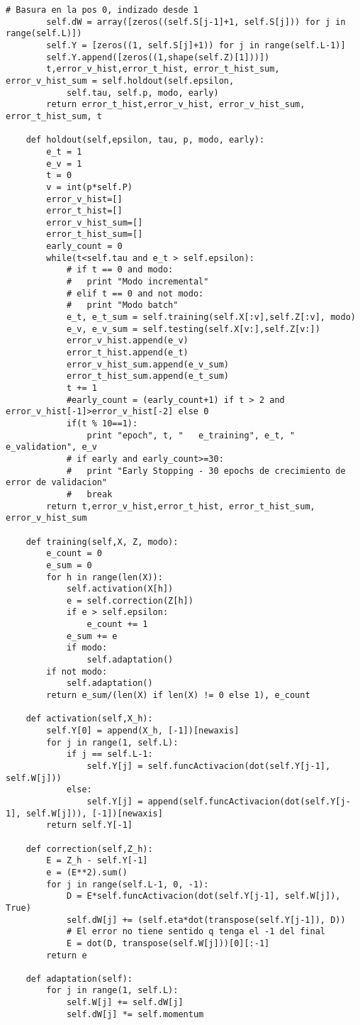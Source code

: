 \begin{lstlisting}[caption=new\_perceptron.py]
		# Basura en la pos 0, indizado desde 1
		self.dW = array([zeros((self.S[j-1]+1, self.S[j])) for j in range(self.L)])
		self.Y = [zeros((1, self.S[j]+1)) for j in range(self.L-1)]
		self.Y.append([zeros((1,shape(self.Z)[1]))])
		t,error_v_hist,error_t_hist, error_t_hist_sum, error_v_hist_sum = self.holdout(self.epsilon, 
			self.tau, self.p, modo, early)
		return error_t_hist,error_v_hist, error_v_hist_sum, error_t_hist_sum, t

	def holdout(self,epsilon, tau, p, modo, early):
		e_t = 1
		e_v = 1
		t = 0
		v = int(p*self.P)
		error_v_hist=[]
		error_t_hist=[]
		error_v_hist_sum=[]
		error_t_hist_sum=[]
		early_count = 0
		while(t<self.tau and e_t > self.epsilon):
			# if t == 0 and modo:
			# 	print "Modo incremental"
			# elif t == 0 and not modo:
			# 	print "Modo batch"			
			e_t, e_t_sum = self.training(self.X[:v],self.Z[:v], modo)
			e_v, e_v_sum = self.testing(self.X[v:],self.Z[v:])
			error_v_hist.append(e_v)
			error_t_hist.append(e_t)
			error_v_hist_sum.append(e_v_sum)
			error_t_hist_sum.append(e_t_sum)
			t += 1
			#early_count = (early_count+1) if t > 2 and error_v_hist[-1]>error_v_hist[-2] else 0
			if(t % 10==1):
				print "epoch", t, "   e_training", e_t, "	e_validation", e_v
			# if early and early_count>=30:
			# 	print "Early Stopping - 30 epochs de crecimiento de error de validacion"
			# 	break
		return t,error_v_hist,error_t_hist, error_t_hist_sum, error_v_hist_sum

	def training(self,X, Z, modo):
		e_count = 0
		e_sum = 0
		for h in range(len(X)): 
			self.activation(X[h])
			e = self.correction(Z[h])
			if e > self.epsilon:
				e_count += 1
			e_sum += e
			if modo:
				self.adaptation()
		if not modo:
			self.adaptation()	
		return e_sum/(len(X) if len(X) != 0 else 1), e_count

	def activation(self,X_h):
		self.Y[0] = append(X_h, [-1])[newaxis]
		for j in range(1, self.L):
			if j == self.L-1:
				self.Y[j] = self.funcActivacion(dot(self.Y[j-1], self.W[j]))
			else:
				self.Y[j] = append(self.funcActivacion(dot(self.Y[j-1], self.W[j])), [-1])[newaxis]
		return self.Y[-1]

	def correction(self,Z_h):
		E = Z_h - self.Y[-1]
		e = (E**2).sum()
		for j in range(self.L-1, 0, -1):   
			D = E*self.funcActivacion(dot(self.Y[j-1], self.W[j]), True)
			self.dW[j] += (self.eta*dot(transpose(self.Y[j-1]), D)) 
			# El error no tiene sentido q tenga el -1 del final
			E = dot(D, transpose(self.W[j]))[0][:-1]
		return e

	def adaptation(self):
		for j in range(1, self.L):
			self.W[j] += self.dW[j] 
			self.dW[j] *= self.momentum


\end{lstlisting}
